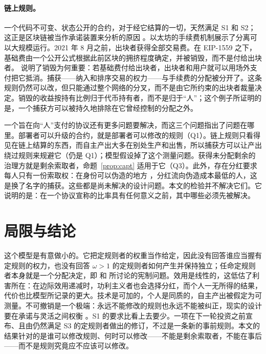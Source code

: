 \paragraph{链上规则。} 一个代码不可变、状态公开的合约，对于经它结算的一切，天然满足 S1 和
S2；这正是区块链被当作承诺装置来分析的原因
\citep{Szabo1997,CongHe2019,HoldenMalani2019}。以太坊的手续费机制展示了分离可以大规模运行。2021 年 8 月之前，出块者获得全部交易费。在 EIP-1559 \citep{Buterin2019} 之下，基础费由一个公开公式根据此前区块的拥挤程度确定，并被销毁，而不是付给出块者。
\citet{Roughgarden2021} 说明了销毁为何重要：若基础费付给出块者，出块者和用户就可以用场外支付把它抵消。捕获——纳入和排序交易的权力——与手续费的分配被分开了。这条规则仍然可以改，但只能通过整个网络的分叉，而不是由它所约束的出块者裁量决定。销毁的收益按持有比例归于代币持有者，而不是归于“人”；这个例子所证明的是，一个捕获方可以被持久地排除在它曾经控制的分配之外。

一个旨在向“人”支付的协议还有更多问题要解决，而这三个问题指出了问题在哪里。部署者可以升级的合约，就是部署者可以修改的规则（Q1）。链上规则只看得见在链上结算的东西，而自主产出大多在别处生产和出售，所以捕获方可以让产出绕过规则来规避它（仍是 Q1）；模型假设掉了这个测量问题。获得未分配剩余的治理方就是剩余索取者，命题~\ref{prop:capt} 适用于它（Q3）。此外，存在分红要求每人只有一份索取权：在身份可以伪造的地方 \citep{Douceur2002,Borge2017}，分红流向伪造成本最低的人，这是换了名字的捕获。这些都是尚未解决的设计问题。本文的检验并不解决它们。它说明的是：在一个协议宣称的比率具有任何意义之前，其中哪些必须先被解决。

\section{局限与结论}

这个模型是有意做小的。它把定规则者的权重当作给定，因此没有回答谁应当握有定规则的权力，也没有回答 $\omega>1$ 的定规则者如何产生并保持独立；任命定规则者本身就是一个分配决定，即
\citet{BrennanBuchanan1980} 和 \citet{PerssonRolandTabellini1997} 所讨论的宪制问题。效用是线性的，这低估了利害所在：在边际效用递减时，功利主义者也会选择分红，而个人一无所得的结果，代价也比模型所记录的更大。技术是可加的，个人是同质的，自主产出被假定为可测量。不可撤销是一个极端：永远不能修改的规则也永远不能被纠正，现实的设计要在承诺与灵活之间权衡
\citep{Rogoff1985}。S1 的要求比看上去要少。一项在下一轮投资之前宣布、且由仍然满足 S3 的定规则者做出的修订，不过是一条新的事前规则。本文的结果针对的是谁可以修改规则、何时可以修改——不能是剩余索取者，不能在事后——而不是规则究竟应不应该可以修改。

